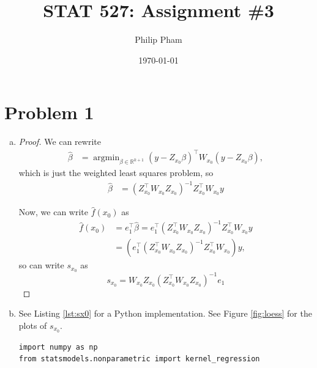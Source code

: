 \documentclass[letterpaper]{article}
\title{STAT 527: Assignment \#3}
\author{Philip Pham}
\date{\today}
\begin{document}
\maketitle

\section*{Problem 1}

\begin{enumerate}[(a)]
\item \begin{proof}
    We can rewrite
    \begin{align*}
      \hat{\beta}
      &= \operatorname{argmin}_{\beta \in \mathbb{R}^{k+1}}
        \left(y - Z_{x_0}\beta\right)^\top W_{x_0} \left(y - Z_{x_0}\beta\right),
    \end{align*}
    which is just the weighted least squares problem, so
    \begin{align*}
      \hat{\beta}
      &= \left(Z_{x_0}^\top W_{x_0} Z_{x_0}\right)^{-1}Z_{x_0}^\top W_{x_0}y
    \end{align*}

    Now, we can write $\hat{f}(x_0)$ as
    \begin{align*}
      \hat{f}(x_0)
      &= e_1^\top \hat{\beta} = e_1^\top\left(Z_{x_0}^\top W_{x_0} Z_{x_0}\right)^{-1}Z_{x_0}^\top W_{x_0} y \\
      &= \left(e_1^\top\left(Z_{x_0}^\top W_{x_0} Z_{x_0}\right)^{-1}Z_{x_0}^\top W_{x_0}\right) y,
    \end{align*}
    so can write $s_{x_0}$ as
    \begin{equation}
      s_{x_0} = W_{x_0}Z_{x_0}\left(Z_{x_0}^\top W_{x_0} Z_{x_0}\right)^{-1} e_1
      \label{eqn:sx0}
    \end{equation}

  \end{proof}
\item See Listing \ref{lst:sx0} for a Python implementation. See Figure
  \ref{fig:loess} for the plots of $s_{x_0}$.
  \begin{listing}
    \begin{verbatim}
import numpy as np
from statsmodels.nonparametric import kernel_regression


\end{verbatim}
\end{listing}
\end{enumerate}
\end{document}
